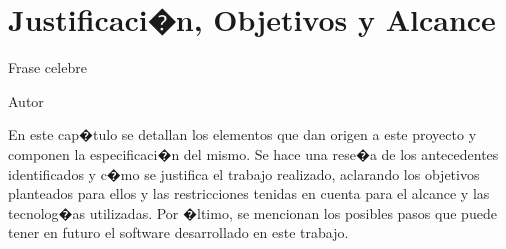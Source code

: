 %
%
%
%
%
%
%
%
%
%

\chapter{Justificaci�n, Objetivos y Alcance}

\begin{FraseCelebre}
\begin{Frase}
Frase celebre

\end{Frase}
\begin{Fuente}
	Autor
\end{Fuente}
\end{FraseCelebre}

\begin{resumen}
En este cap�tulo se detallan los elementos que dan origen a este proyecto y componen la especificaci�n del mismo. Se hace una rese�a de los antecedentes identificados y c�mo se justifica el trabajo realizado, aclarando los objetivos planteados para ellos y las restricciones tenidas en cuenta para el alcance y las tecnolog�as utilizadas. Por �ltimo, se mencionan los posibles pasos que puede tener en futuro el software desarrollado en este trabajo.
\end{resumen}

